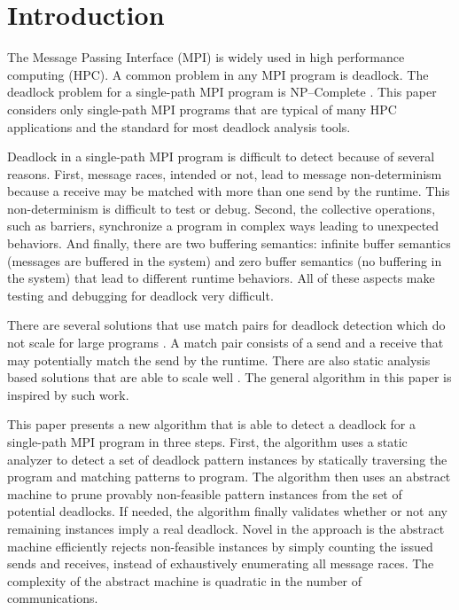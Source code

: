 \section{Introduction}

The Message Passing Interface (MPI) is widely used in high performance computing (HPC). A common problem in any MPI program is deadlock. The deadlock problem for a single-path MPI program is NP--Complete \cite{DBLP:conf/fm/ForejtKNS14}.
This paper considers only single-path MPI programs that are typical of many HPC applications and the standard for most deadlock analysis tools.  

Deadlock in a single-path MPI program is difficult to detect because of several reasons. First, message races, intended or not, lead to message non-determinism because a receive may be matched with more than one send by the runtime. This non-determinism is difficult to test or debug. Second, the collective operations, such as barriers, synchronize a program in complex ways leading to unexpected behaviors. And finally, there are two buffering semantics: infinite buffer semantics (messages are buffered in the system) and zero buffer semantics (no buffering in the system) that lead to different runtime behaviors. All of these aspects make testing and debugging for deadlock very difficult. 

There are several solutions that use match pairs for deadlock detection which do not scale for large programs \cite{DBLP:conf/ppopp/VakkalankaSGK08, DBLP:conf/sbmf/SharmaGB12, DBLP:conf/fm/ForejtKNS14}. A match pair consists of a send and a receive that may potentially match the send by the runtime. There are also static analysis based solutions that are able to scale well \cite{DBLP:conf/sc/SharmaGB12, DBLP:conf/pldi/JoshiPSN09, Subodh:Dissertation}. The general algorithm in this paper is inspired by such work.

This paper presents a new algorithm that is able to detect a deadlock for a single-path MPI program in three steps. First, the algorithm uses a static analyzer to detect a set of deadlock pattern instances by statically traversing the program and matching patterns to program. The algorithm then uses an abstract machine to prune provably non-feasible pattern instances from the set of potential deadlocks. If needed, the algorithm finally validates whether or not any remaining instances imply a real deadlock. Novel in the approach is the abstract machine efficiently rejects non-feasible instances by simply counting the issued sends and receives, instead of exhaustively enumerating all message races. The complexity of the abstract machine is quadratic in the number of communications. 


